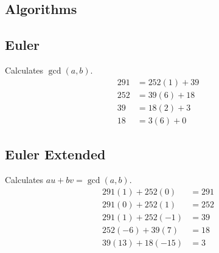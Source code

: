 \documentclass{article}
\begin{document}
\begin{multicols*}{2}
\section*{Algorithms}

\subsection*{Euler}
Calculates $\gcd(a, b)$.
\begin{align*}
    291 &= 252(1) + 39        \\
    252 &= 39(6)  + 18        \\
    39  &= 18(2)  + \boxed{3} \\
    18  &= 3(6)   + 0
\end{align*}

\subsection*{Euler Extended}
Calculates $au + bv = \gcd(a, b)$.
\begin{align*}
    291(1)  + 252(0)  &= 291 \\
    291(0)  + 252(1)  &= 252 \\
    291(1)  + 252(-1) &= 39  \\
    252(-6) + 39(7)   &= 18  \\
    39(13)  + 18(-15) &= 3
\end{align*}

\end{multicols*}
\pagebreak
\end{document}
